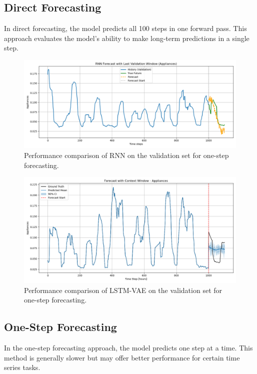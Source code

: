 \documentclass{article}
\begin{document}
\subsection{Direct Forecasting}
In direct forecasting, the model predicts all 100 steps in one forward pass. This approach evaluates the model's ability to make long-term predictions in a single step.

\begin{figure}[h!]
    \centering
    \includegraphics[width=1\textwidth]{pics/rnn_direct_forecast.png}
    \caption{Performance comparison of RNN on the validation set for one-step forecasting.}
    \label{fig:one_step_forecasting_comparison}
\end{figure}

\begin{figure}[h!]
    \centering
    \includegraphics[width=1\textwidth]{pics/lstmvae_direct_forecast.png}
    \caption{Performance comparison of LSTM-VAE on the validation set for one-step forecasting.}
    \label{fig:one_step_forecasting_error}
\end{figure}

\subsection{One-Step Forecasting}
In the one-step forecasting approach, the model predicts one step at a time. This method is generally slower but may offer better performance for certain time series tasks.
\end{document}
